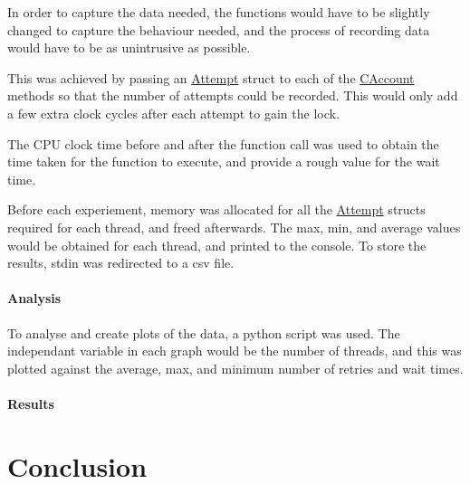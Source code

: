 \documentclass[12pt]{article}
\begin{document}
In order to capture the data needed, the functions would have to be slightly changed to capture the behaviour needed, and the process of recording data would have to be as unintrusive as possible. 

This was achieved by passing an \url{Attempt} struct to each of the \url{CAccount} methods so that the number of attempts could be recorded. This would only add a few extra clock cycles after each attempt to gain the lock.

The CPU clock time before and after the function call was used to obtain the time taken for the function to execute, and provide a rough value for the wait time.

Before each experiement, memory was allocated for all the \url{Attempt} structs required for each thread, and freed afterwards. The max, min, and average values would be obtained for each thread, and printed to the console. To store the results, stdin was redirected to a csv file.

\subsection{Analysis}

To analyse and create plots of the data, a python script was used. The independant variable in each graph would be the number of threads, and this was plotted against the average, max, and minimum number of retries and wait times.

\subsection{Results}

\part*{Conclusion}



\end{document}
